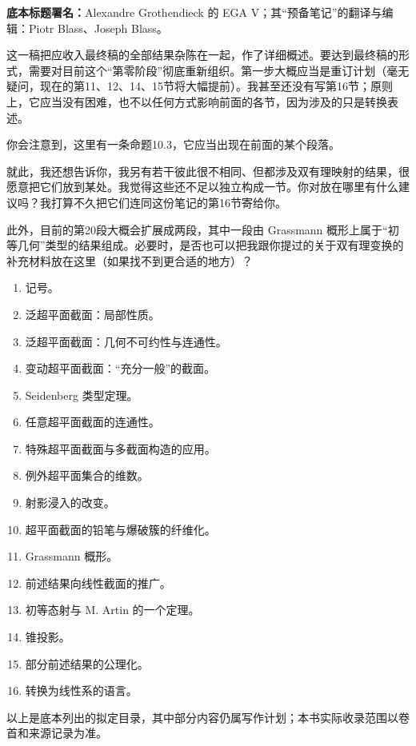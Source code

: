 \noindent\textbf{底本标题署名：}Alexandre Grothendieck 的 EGA V；其“预备笔记”的翻译与编辑：Piotr Blass、Joseph Blass。

这一稿把应收入最终稿的全部结果杂陈在一起，作了详细概述。要达到最终稿的形式，需要对目前这个“第零阶段”彻底重新组织。第一步大概应当是重订计划（毫无疑问，现在的第11、12、14、15节将大幅提前）。我甚至还没有写第16节；原则上，它应当没有困难，也不以任何方式影响前面的各节，因为涉及的只是转换表述。

你会注意到，这里有一条命题10.3，它应当出现在前面的某个段落。

就此，我还想告诉你，我另有若干彼此很不相同、但都涉及双有理映射的结果，很愿意把它们放到某处。我觉得这些还不足以独立构成一节。你对放在哪里有什么建议吗？我打算不久把它们连同这份笔记的第16节寄给你。

此外，目前的第20段大概会扩展成两段，其中一段由 Grassmann 概形上属于“初等几何”类型的结果组成。必要时，是否也可以把我跟你提过的关于双有理变换的补充材料放在这里（如果找不到更合适的地方）？

\begin{enumerate}[label=\arabic*)]
\item 记号。
\item 泛超平面截面：局部性质。
\item 泛超平面截面：几何不可约性与连通性。
\item 变动超平面截面：“充分一般”的截面。
\item Seidenberg 类型定理。
\item 任意超平面截面的连通性。
\item 特殊超平面截面与多截面构造的应用。
\item 例外超平面集合的维数。
\item 射影浸入的改变。
\item 超平面截面的铅笔与爆破簇的纤维化。
\item Grassmann 概形。
\item 前述结果向线性截面的推广。
\item 初等态射与 M. Artin 的一个定理。
\item 锥投影。
\item 部分前述结果的公理化。
\item 转换为线性系的语言。
\end{enumerate}
以上是底本列出的拟定目录，其中部分内容仍属写作计划；本书实际收录范围以卷首和来源记录为准。

